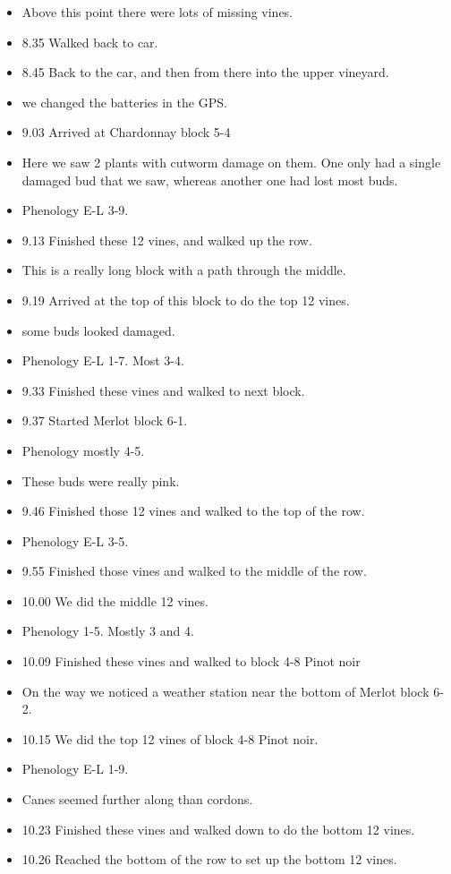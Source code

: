 \documentclass[11pt,letter]{article}
\newenvironment{smitemize}{
\begin{itemize}
  \setlength{\itemsep}{0pt}
  \setlength{\parskip}{0.8pt}
  \setlength{\parsep}{0pt}}
{\end{itemize}
}
\begin{document}
\begin{smitemize}
\item Above this point there were lots of missing vines. 
\item 8.35 Walked back to car. 
\item 8.45 Back to the car, and then from there into the upper vineyard. 
\item we changed the batteries in the GPS. 
\item 9.03 Arrived at Chardonnay block 5-4
\item Here we saw 2 plants with cutworm damage on them. One only had a single damaged bud that we saw, whereas another one had lost most buds.
\item Phenology E-L 3-9. 
\item 9.13 Finished these 12 vines, and walked up the row.
\item This is a really long block with a path through the middle.
\item 9.19 Arrived at the top of this block to do the top 12 vines.
\item some buds looked damaged.
\item Phenology E-L 1-7. Most 3-4. 
\item 9.33 Finished these vines and walked to next block.
\item 9.37 Started Merlot block 6-1. 
\item Phenology mostly 4-5. 
\item These buds were really pink. 
\item 9.46 Finished those 12 vines and walked to the top of the row.
\item Phenology E-L 3-5.
\item 9.55 Finished those vines and walked to the middle of the row. 
\item 10.00 We did the middle 12 vines.      
\item Phenology 1-5. Mostly 3 and 4. 
\item 10.09 Finished these vines and walked to block 4-8 Pinot noir
\item On the way we noticed a weather station near the bottom of Merlot block 6-2.  
\item 10.15 We did the top 12 vines of block 4-8 Pinot noir. 
\item Phenology E-L 1-9. 
\item Canes seemed further along than cordons. 
\item 10.23 Finished these vines and walked down to do the bottom 12 vines. 
\item 10.26 Reached the bottom of the row to set up the bottom 12 vines. 

\end{smitemize}
\end{document}
